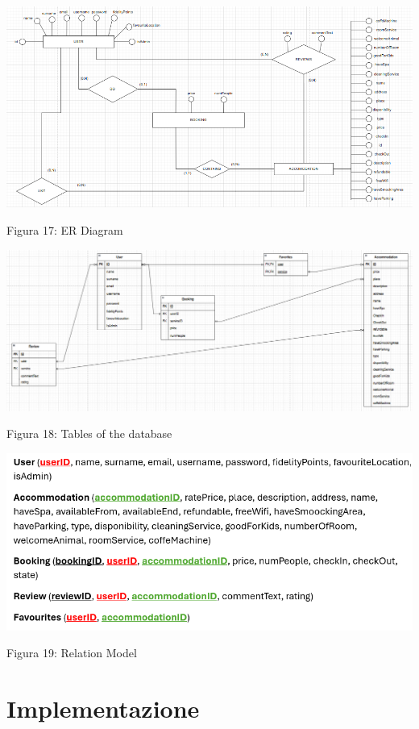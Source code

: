 \documentclass[10pt]{article}
\begin{document}
\begin{center}
\par\medskip
\includegraphics[scale=0.6]{ERImages/finalER}
\par\medskip
Figura 17: ER Diagram
\par\medskip
\includegraphics[scale=0.5]{ERImages/finaleTablesER}
\par\medskip
Figura 18: Tables of the database
\par\smallskip
\includegraphics[scale=1]{ERImages/RelationalModel}
\par\smallskip
Figura 19: Relation Model
\par\medskip
\end{center}

\section{Implementazione}
\end{document}
